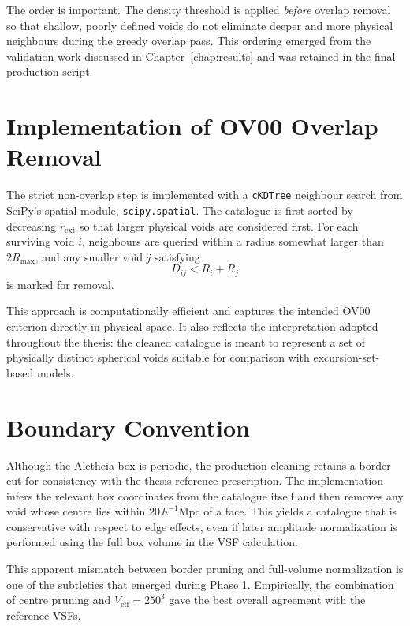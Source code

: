 \documentclass[12pt]{report}
\begin{document}
The order is important. The density threshold is applied \emph{before} overlap removal so that shallow, poorly defined voids do not eliminate deeper and more physical neighbours during the greedy overlap pass. This ordering emerged from the validation work discussed in Chapter~\ref{chap:results} and was retained in the final production script.

\section{Implementation of OV00 Overlap Removal}

The strict non-overlap step is implemented with a \texttt{cKDTree} neighbour search from SciPy's spatial module, \texttt{scipy.spatial}. The catalogue is first sorted by decreasing $r_\mathrm{ext}$ so that larger physical voids are considered first. For each surviving void $i$, neighbours are queried within a radius somewhat larger than $2R_\mathrm{max}$, and any smaller void $j$ satisfying
\begin{equation}
    D_{ij} < R_i + R_j
\end{equation}
is marked for removal.

This approach is computationally efficient and captures the intended OV00 criterion directly in physical space. It also reflects the interpretation adopted throughout the thesis: the cleaned catalogue is meant to represent a set of physically distinct spherical voids suitable for comparison with excursion-set-based models.

\section{Boundary Convention}

Although the Aletheia box is periodic, the production cleaning retains a border cut for consistency with the thesis reference prescription. The implementation infers the relevant box coordinates from the catalogue itself and then removes any void whose centre lies within $20\,h^{-1}\mathrm{Mpc}$ of a face. This yields a catalogue that is conservative with respect to edge effects, even if later amplitude normalization is performed using the full box volume in the VSF calculation.

This apparent mismatch between border pruning and full-volume normalization is one of the subtleties that emerged during Phase 1. Empirically, the combination of centre pruning and $V_\mathrm{eff}=250^3$ gave the best overall agreement with the reference VSFs.
\end{document}
